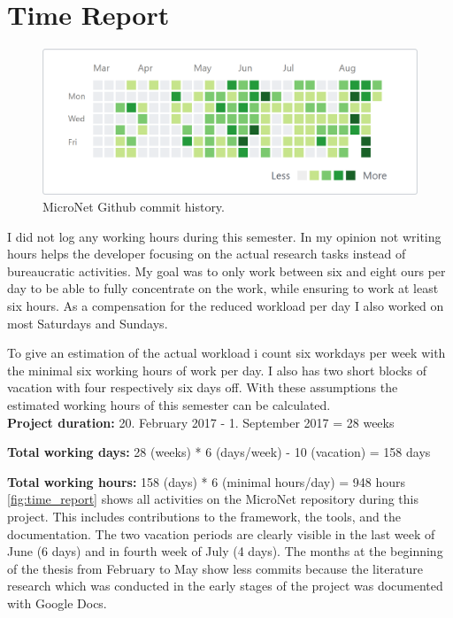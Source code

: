 \chapter{Time Report}

\begin{figure}[H]
  	\centering
  	\includegraphics[width=\textwidth]{images/TimeReport}
  	\caption{MicroNet Github commit history.}
  	\label{fig:time_report}
\end{figure}

I did not log any working hours during this semester. In my opinion not writing
hours helps the developer focusing on the actual research tasks instead of
bureaucratic activities. My goal was to only work between six and eight ours per
day to be able to fully concentrate on the work, while ensuring to work at least
six hours. As a compensation for the reduced workload per day I also worked on
most Saturdays and Sundays.

To give an estimation of the actual workload i count six workdays per week with
the minimal six working hours of work per day. I also has two short blocks of
vacation with four respectively six days off. With these assumptions the
estimated working hours of this semester can be calculated.\\

\noindent\textbf{Project duration:} 20. February 2017 - 1. September 2017 = 28
weeks

\noindent\textbf{Total working days:} 28 (weeks) * 6 (days/week) - 10
(vacation) = 158 days

\noindent\textbf{Total working hours:} 158 (days) * 6 (minimal hours/day) = 948
hours\\

\autoref{fig:time_report} shows all activities on the MicroNet repository during
this project. This includes contributions to the framework, the tools, and the
documentation. The two vacation periods are clearly visible in the last week of
June (6 days) and in fourth week of July (4 days). The months at the beginning
of the thesis from February to May show less commits because the literature
research which was conducted in the early stages of the project was
documented with Google Docs.
